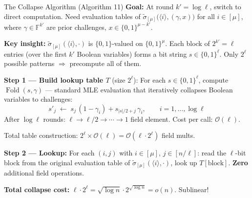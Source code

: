\documentclass[aspectratio=169,10pt]{beamer}
\newcommand{\F}{\mathbb{F}}
\newcommand{\B}{\{0,1\}}
\newcommand{\wt}[1]{\widetilde{#1}}
\newcommand{\bigO}{\mathcal{O}}
\begin{document}
\begin{frame}{The Collapse Algorithm (Algorithm 11)}
\textbf{Goal:} At round $k' = \log\ell$, switch to direct computation.  Need evaluation tables of
$\wt{\sigma}_{[\mu]}\!\bigl(\langle i \rangle, (\gamma, x)\bigr)$ for all $i \in [\mu]$, where $\gamma \in \F^{k'}$ are prior challenges, $x \in \B^{\mu - k'}$.

\vspace{0.4em}
\textbf{Key insight:} $\wt{\sigma}_{[\mu]}(\langle i \rangle, \cdot)$ is $\{0,1\}$-valued on $\B^\mu$.  Each block of $2^{k'}\!=\!\ell$ entries (over the first $k'$ Boolean variables) forms a bit string $s \in \{0,1\}^\ell$.  Only $2^\ell$ possible patterns $\Rightarrow$ precompute all of them.

\vspace{0.4em}
\textbf{Step 1 --- Build lookup table $T$} (size $2^\ell$):\;
For each $s \in \{0,1\}^\ell$, compute $\operatorname{Fold}(s, \gamma)$ --- standard MLE evaluation that iteratively collapses Boolean variables to challenges:
\[
  s'_j \;\leftarrow\; s_j\,(1 - \gamma_i) + s_{|s|/2+j}\,\gamma_i, \qquad i = 1,\ldots,\log\ell
\]
After $\log\ell$ rounds: $\ell \to \ell/2 \to \cdots \to 1$ field element.  Cost per call: $\bigO(\ell)$.

Total table construction: $2^\ell \times \bigO(\ell) = \bigO(\ell \cdot 2^\ell)$ field mults.

\vspace{0.4em}
\textbf{Step 2 --- Lookup:} For each $(i, j)$ with $i \in [\mu]$, $j \in [n/\ell]$: read the $\ell$-bit block from the original evaluation table of $\wt{\sigma}_{[\mu]}(\langle i \rangle, \cdot)$, look up $T[\text{block}]$.  \textbf{Zero} additional field operations.

\vspace{0.3em}
\textbf{Total collapse cost:} $\ell \cdot 2^\ell = \sqrt{\log n} \cdot 2^{\sqrt{\log n}} = o(n)$. \quad Sublinear!
\end{frame}
\end{document}
